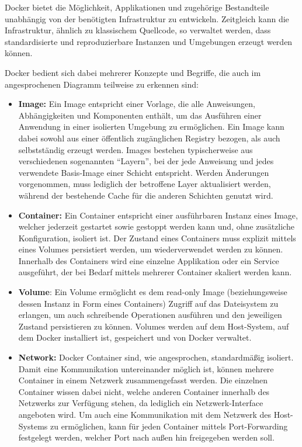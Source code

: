 \documentclass[a4paper,12pt,twoside,numbers=noendperiod]{scrreprt}
\begin{document}
Docker bietet die Möglichkeit, Applikationen und zugehörige Bestandteile unabhängig von der benötigten Infrastruktur zu entwickeln. Zeitgleich kann die Infrastruktur, ähnlich zu klassischem Quellcode, so verwaltet werden, dass standardisierte und reproduzierbare Instanzen und Umgebungen erzeugt werden können. \cite{docker_inc_docker_2023}

Docker bedient sich dabei mehrerer Konzepte und Begriffe, die auch im angesprochenen Diagramm teilweise zu erkennen sind:
\begin{itemize}
    \item \textbf{Image:} Ein Image entspricht einer Vorlage, die alle Anweisungen, Abhängigkeiten und Komponenten enthält, um das Ausführen einer Anwendung in einer isolierten Umgebung zu ermöglichen. Ein Image kann dabei sowohl aus einer öffentlich zugänglichen Registry bezogen, als auch selbstständig erzeugt werden. Images bestehen typischerweise aus verschiedenen sogenannten \enquote{Layern}, bei der jede Anweisung und jedes verwendete Basis-Image einer Schicht entspricht. Werden Änderungen vorgenommen, muss lediglich der betroffene Layer aktualisiert werden, während der bestehende Cache für die anderen Schichten genutzt wird. \cite{docker_inc_docker_2023, montemagno_docker_2023}
    \item \textbf{Container:} Ein Container entspricht einer ausführbaren Instanz eines Image, welcher jederzeit gestartet sowie gestoppt werden kann und, ohne zusätzliche Konfiguration, isoliert ist. Der Zustand eines Containers muss explizit mittels eines Volumes persistiert werden, um wiederverwendet werden zu können. Innerhalb des Containers wird eine einzelne Applikation oder ein Service ausgeführt, der bei Bedarf mittels mehrerer Container skaliert werden kann. \cite{docker_inc_docker_2023, montemagno_docker_2023}
    \item \textbf{Volume}: Ein Volume ermöglicht es dem read-only Image (beziehungsweise dessen Instanz in Form eines Containers)  Zugriff auf das Dateisystem zu erlangen, um auch schreibende Operationen ausführen und den jeweiligen Zustand persistieren zu können. Volumes werden auf dem Host-System, auf dem Docker installiert ist, gespeichert und von Docker verwaltet. \cite{montemagno_docker_2023}
    \item \textbf{Network:} Docker Container sind, wie angesprochen, standardmäßig isoliert. Damit eine Kommunikation untereinander möglich ist, können mehrere Container in einem Netzwerk zusammengefasst werden. Die einzelnen Container wissen dabei nicht, welche anderen Container innerhalb des Netzwerks zur Verfügung stehen, da lediglich ein Netzwerk-Interface angeboten wird. Um auch eine Kommunikation mit dem Netzwerk des Host-Systems zu ermöglichen, kann für jeden Container mittels Port-Forwarding festgelegt werden, welcher Port nach außen hin freigegeben werden soll. \cite{docker_inc_networking_overview_2023}
\end{itemize}
\end{document}
